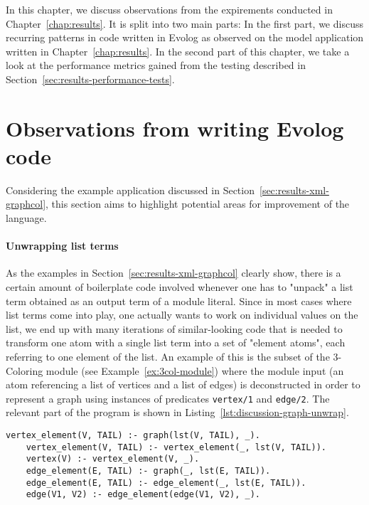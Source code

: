 In this chapter, we discuss observations from the expirements conducted in Chapter~\ref{chap:results}. It is split into two main parts: In the first part, we discuss recurring patterns in code written in Evolog as observed on the model application written in Chapter~\ref{chap:results}. In the second part of this chapter, we take a look at the performance metrics gained from the testing described in Section~\ref{sec:results-performance-tests}.

\section{Observations from writing Evolog code}

Considering the example application discussed in Section~\ref{sec:results-xml-graphcol}, this section aims to highlight potential areas for improvement of the language.

\paragraph{Unwrapping list terms}
As the examples in Section~\ref{sec:results-xml-graphcol} clearly show, there is a certain amount of boilerplate code involved whenever one has to "unpack" a list term obtained as an output term of a module literal. Since in most cases where list terms come into play, one actually wants to work on individual values on the list, we end up with many iterations of similar-looking code that is needed to transform one atom with a single list term into a set of "element atoms", each referring to one element of the list. An example of this is the subset of the 3-Coloring module (see Example~\ref{ex:3col-module}) where the module input (an atom referencing a list of vertices and a list of edges) is deconstructed in order to represent a graph using instances of predicates \texttt{vertex/1} and \texttt{edge/2}. The relevant part of the program is shown in Listing~\ref{lst:discussion-graph-unwrap}.

\begin{lstlisting}[style=asp-code, label={lst:discussion-graph-unwrap}, caption={Unwrapping list terms representing a graph}]
	vertex_element(V, TAIL) :- graph(lst(V, TAIL), _).
	vertex_element(V, TAIL) :- vertex_element(_, lst(V, TAIL)).
	vertex(V) :- vertex_element(V, _).
	edge_element(E, TAIL) :- graph(_, lst(E, TAIL)).
	edge_element(E, TAIL) :- edge_element(_, lst(E, TAIL)).
	edge(V1, V2) :- edge_element(edge(V1, V2), _).
\end{lstlisting}

